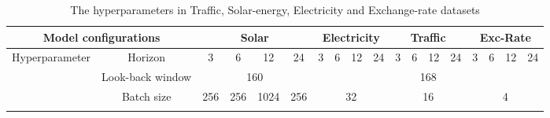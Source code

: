 \documentclass{article}
\begin{document}
\begin{table*}[h]
\centering
\caption{The hyperparameters in Traffic, Solar-energy, Electricity and Exchange-rate datasets}
\resizebox{\textwidth}{!}
{
\begin{tabular}{ccclllclllclllclll}
\hline
\multicolumn{2}{c|}{Model configurations}                                                                        & \multicolumn{4}{c|}{Solar}                                                                        & \multicolumn{4}{c|}{Electricity}                                                                          & \multicolumn{4}{c|}{Traffic}                                                                    & \multicolumn{4}{c}{Exc-Rate}                                                                      \\ \hline
\multicolumn{1}{c|}{\multirow{4}{*}{Hyperparameter}} & \multicolumn{1}{c|}{Horizon}                              & \multicolumn{1}{c|}{3} & \multicolumn{1}{c|}{6} & \multicolumn{1}{c|}{12} & \multicolumn{1}{c|}{24} & \multicolumn{1}{c|}{3} & \multicolumn{1}{c|}{6} & \multicolumn{1}{c|}{12} & \multicolumn{1}{c|}{24} & \multicolumn{1}{c|}{3} & \multicolumn{1}{c|}{6} & \multicolumn{1}{c|}{12} & \multicolumn{1}{c|}{24} & \multicolumn{1}{c|}{3} & \multicolumn{1}{c|}{6} & \multicolumn{1}{c|}{12} & \multicolumn{1}{c}{24} \\ \cline{2-18} 
\multicolumn{1}{c|}{}                                & \multicolumn{1}{c|}{Look-back window}                     & \multicolumn{4}{c|}{160}   & \multicolumn{12}{c}{168}                                                                                                                                                                                                                                                                                                                                                                                            \\ \cline{2-18} 
\multicolumn{1}{c|}{}                                & \multicolumn{1}{c|}{Batch size}                           & \multicolumn{1}{c|}{256}   & \multicolumn{1}{c|}{256}& \multicolumn{1}{c|}{1024}& \multicolumn{1}{c|}{256}                                                                          & \multicolumn{4}{c|}{32}                                                                           & \multicolumn{4}{c|}{16}                                                                             & \multicolumn{4}{c}{4}                                                                             \\ \cline{2-18} 

\end{tabular}}
\end{table*}
\end{document}
